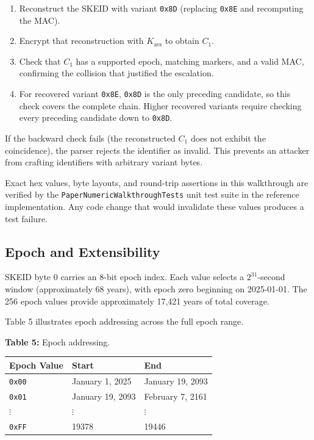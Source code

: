 \documentclass[fleqn,10pt,lineno]{wlpeerj}
\newcounter{none} %
\providecommand{\tightlist}{%
  \setlength{\itemsep}{0pt}\setlength{\parskip}{0pt}}
\begin{document}
\begin{enumerate}
\def\labelenumi{\arabic{enumi}.}
\tightlist
\item
  Reconstruct the SKEID with variant \texttt{0x8D} (replacing
  \texttt{0x8E} and recomputing the MAC).
\item
  Encrypt that reconstruction with \(K_{\mathrm{aes}}\) to obtain
  \(C_1\).
\item
  Check that \(C_1\) has a supported epoch, matching markers, and a
  valid MAC, confirming the collision that justified the escalation.
\item
  For recovered variant \texttt{0x8E}, \texttt{0x8D} is the only
  preceding candidate, so this check covers the complete chain. Higher
  recovered variants require checking every preceding candidate down to
  \texttt{0x8D}.
\end{enumerate}

If the backward check fails (the reconstructed \(C_1\) does not exhibit
the coincidence), the parser rejects the identifier as invalid. This
prevents an attacker from crafting identifiers with arbitrary variant
bytes.

Exact hex values, byte layouts, and round-trip assertions in this
walkthrough are verified by the \texttt{PaperNumericWalkthroughTests}
unit test suite in the reference implementation. Any code change that
would invalidate these values produces a test failure.

\subsection{Epoch and Extensibility}\label{epoch-and-extensibility}

SKEID byte 0 carries an 8-bit epoch index. Each value selects a
\(2^{31}\)-second window (approximately 68 years), with epoch zero
beginning on 2025-01-01. The 256 epoch values provide approximately
17,421 years of total coverage.

Table 5 illustrates epoch addressing across the full epoch range.

\textbf{Table 5:} Epoch addressing.

{\def\LTcaptype{none} %
\begin{longtable}[]{@{}lll@{}}
\toprule\noalign{}
Epoch Value & Start & End \\
\midrule\noalign{}
\endhead
\bottomrule\noalign{}
\endlastfoot
\texttt{0x00} & January 1, 2025 & January 19, 2093 \\
\texttt{0x01} & January 19, 2093 & February 7, 2161 \\
\(\vdots\) & \(\vdots\) & \(\vdots\) \\
\texttt{0xFF} & 19378 & 19446 \\
\end{longtable}
}
\end{document}
